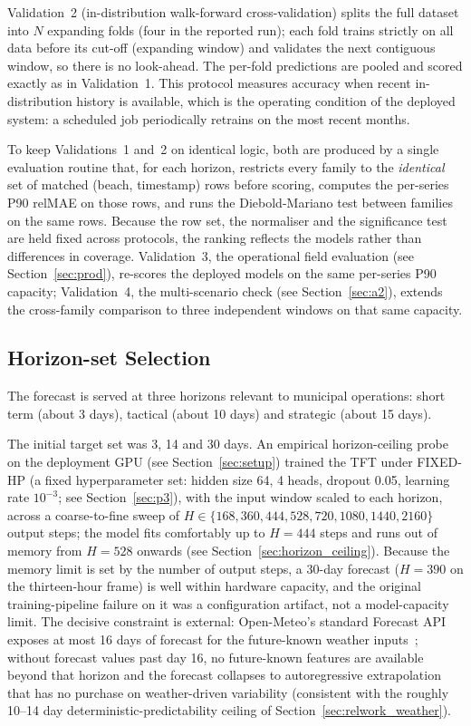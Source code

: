\documentclass[twocolumn,twoside,a4paper,10pt]{IEEEtran}
\begin{document}
Validation~2 (in-distribution walk-forward cross-validation) splits the full dataset into $N$ expanding folds (four in the reported run); each fold trains strictly on all data before its cut-off (expanding window) and validates the next contiguous window, so there is no look-ahead. The per-fold predictions are pooled and scored exactly as in Validation~1. This protocol measures accuracy when recent in-distribution history is available, which is the operating condition of the deployed system: a scheduled job periodically retrains on the most recent months.

To keep Validations~1 and~2 on identical logic, both are produced by a single evaluation routine that, for each horizon, restricts every family to the \emph{identical} set of matched (beach, timestamp) rows before scoring, computes the per-series P90 relMAE on those rows, and runs the Diebold-Mariano test between families on the same rows. Because the row set, the normaliser and the significance test are held fixed across protocols, the ranking reflects the models rather than differences in coverage. Validation~3, the operational field evaluation (see Section~\ref{sec:prod}), re-scores the deployed models on the same per-series P90 capacity; Validation~4, the multi-scenario check (see Section~\ref{sec:a2}), extends the cross-family comparison to three independent windows on that same capacity.

\subsection{Horizon-set Selection}

The forecast is served at three horizons relevant to municipal operations: short term (about 3 days), tactical (about 10 days) and strategic (about 15 days).

The initial target set was 3, 14 and 30 days. An empirical horizon-ceiling probe on the deployment GPU (see Section~\ref{sec:setup}) trained the TFT under FIXED-HP (a fixed hyperparameter set: hidden size 64, 4 heads, dropout 0.05, learning rate $10^{-3}$; see Section~\ref{sec:p3}), with the input window scaled to each horizon, across a coarse-to-fine sweep of $H \in \{168, 360, 444, 528, 720, 1080, 1440, 2160\}$ output steps; the model fits comfortably up to \mbox{$H{=}444$} steps and runs out of memory from $H{=}528$ onwards (see Section~\ref{sec:horizon_ceiling}). Because the memory limit is set by the number of output steps, a 30-day forecast ($H{=}390$ on the thirteen-hour frame) is well within hardware capacity, and the original training-pipeline failure on it was a configuration artifact, not a model-capacity limit. The decisive constraint is external: Open-Meteo's standard Forecast API exposes at most 16 days of forecast for the future-known weather inputs~\cite{OpenMeteo2024}; without forecast values past day 16, no future-known features are available beyond that horizon and the forecast collapses to autoregressive extrapolation that has no purchase on weather-driven variability (consistent with the roughly 10--14 day deterministic-predictability ceiling of Section~\ref{sec:relwork_weather}).
\end{document}

